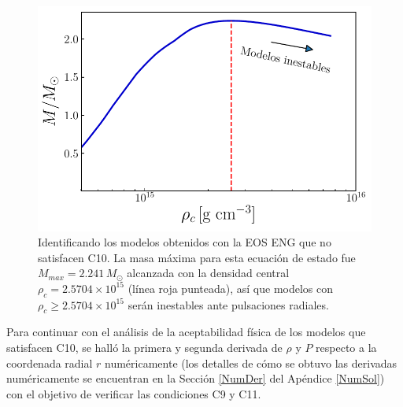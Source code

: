 \begin{figure}[H]
    \centering
    \includegraphics[width=0.7\linewidth]{figures/Mrhorel_eng.pdf}
    \caption[Identificando los modelos obtenidos con la EOS ENG que no satisfacen C10]{Identificando los modelos obtenidos con la EOS ENG que no satisfacen C10. La masa máxima para esta ecuación de estado fue $M_{max}=2.241\,M_{\odot}$ alcanzada con la densidad central $\rho_c=2.5704 \times 10^{15}$ (línea roja punteada), así que modelos con $\rho_c \geq 2.5704 \times 10^{15}$ serán inestables ante pulsaciones radiales. }
    \label{mrhoeng}
\end{figure}
Para continuar con el análisis de la aceptabilidad física de los modelos que satisfacen C10, se halló la primera y segunda derivada de $\rho$ y $P$ respecto a la coordenada radial $r$ numéricamente (los detalles de cómo se obtuvo las derivadas numéricamente se encuentran en la Sección \ref{NumDer} del Apéndice \ref{NumSol}) con el objetivo de verificar las condiciones C9 y C11.  


